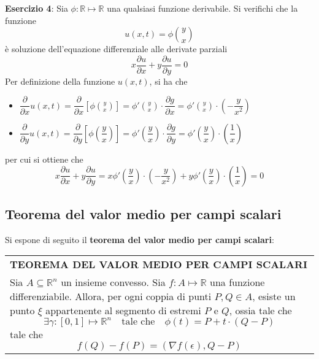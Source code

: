 \documentclass[a4paper]{extarticle}
\renewcommand\arraystretch{}
\begin{document}
\vspace{2em}
\noindent
\textbf{Esercizio 4}: Sia $\phi : \mathbb{R} \longmapsto \mathbb{R}$ una qualsiasi funzione derivabile. Si verifichi che la funzione
\[u(x,t)=\phi \binom{y}{x}\]
è soluzione dell'equazione differenziale alle derivate parziali
\[x \dfrac{\partial u}{\partial x} + y \dfrac{\partial u}{\partial y} = 0\]
Per definizione della funzione $u(x,t)$, si ha che
\begin{itemize}
    \item $\dfrac{\partial}{\partial x} u(x,t) = \dfrac{\partial}{\partial x} \left[\phi \displaystyle{\binom{y}{x}}\right] = \phi' \displaystyle{\binom{y}{x}} \cdot \dfrac{\partial g}{\partial x} = \phi' \displaystyle{\binom{y}{x}} \cdot \left(-\dfrac{y}{x^2}\right)$
    \item $\dfrac{\partial}{\partial y} u(x,t) = \dfrac{\partial}{\partial y} \left[\phi \left(\dfrac{y}{x}\right)\right] = \phi' \left(\dfrac{y}{x}\right) \cdot \dfrac{\partial g}{\partial y} = \phi' \left(\dfrac{y}{x}\right) \cdot \left(\dfrac{1}{x}\right)$
\end{itemize}
per cui si ottiene che
\[x \dfrac{\partial u}{\partial x} + y \dfrac{\partial u}{\partial y} = x \phi' \left(\dfrac{y}{x}\right) \cdot \left(-\dfrac{y}{x^2}\right) + y \phi' \left(\dfrac{y}{x}\right) \cdot \left(\dfrac{1}{x}\right) = 0\]

\vspace{1em}
\noindent
\subsection{Teorema del valor medio per campi scalari}
Si espone di seguito il \textbf{teorema del valor medio per campi scalari}:


\vspace{1em}
\setlength{\tabcolsep}{14pt}
\renewcommand{\arraystretch}{2}
\noindent
\begin{tabularx}{\textwidth}{@{}|P|@{}}
    \hline
    {\textbf{TEOREMA DEL VALOR MEDIO PER CAMPI SCALARI}}\\
    \parbox{\linewidth}{Sia $A \subseteq \mathbb{R}^n$ un insieme convesso. Sia $f : A \longmapsto \mathbb{R}$ una funzione differenziabile. Allora, per ogni coppia di punti $P,Q \in A$, esiste un punto $\xi$ appartenente al segmento di estremi $P$ e $Q$, ossia tale che
    \[\exists \gamma : [0,1] \longmapsto \mathbb{R}^n \hspace{1em} \text{tale che} \hspace{1em} \phi(t) =P + t \cdot (Q-P)\]
    tale che
    \[f(Q)-f(P) = \left(\nabla f(\epsilon),Q-P\right)\]
    \vspace{-1mm}}\\
    \hline
\end{tabularx}
\end{document}
